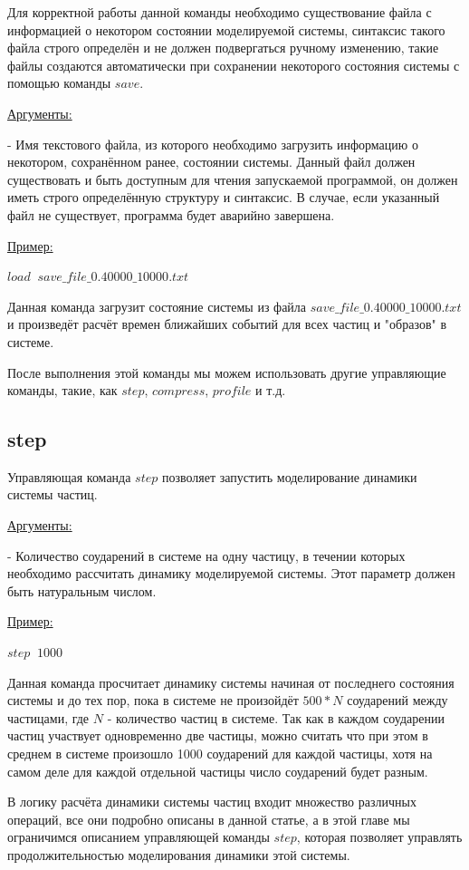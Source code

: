 \documentclass[a4paper]{article}
\begin{document}
Для корректной работы данной команды необходимо существование файла с информацией о некотором состоянии моделируемой системы, синтаксис такого файла строго определён и не должен подвергаться ручному изменению, такие файлы создаются автоматически при сохранении некоторого состояния системы с помощью команды $ save $.

\uline{Аргументы:}

- Имя текстового файла, из которого необходимо загрузить информацию о некотором, сохранённом ранее, состоянии системы. Данный файл должен существовать и быть доступным для чтения запускаемой программой, он должен иметь строго определённую структуру и синтаксис. В случае, если указанный файл не существует, программа будет аварийно завершена.

\uline{Пример:}

$ load \;\; save\_file\_0.40000\_10000.txt $

Данная команда загрузит состояние системы из файла $ save\_file\_0.40000\_10000.txt $ и произведёт расчёт времен ближайших событий для всех частиц и "образов" в системе.

После выполнения этой команды мы можем использовать другие управляющие команды, такие, как $ step $, $ compress $, $ profile $ и т.д.

\subsection{step}
Управляющая команда $ step $ позволяет запустить моделирование динамики системы частиц.

\uline{Аргументы:}

- Количество соударений в системе на одну частицу, в течении которых необходимо рассчитать динамику моделируемой системы. Этот параметр должен быть натуральным числом.

\uline{Пример:}

$ step \;\; 1000 $

Данная команда просчитает динамику системы начиная от последнего состояния системы и до тех пор, пока в системе не произойдёт $ 500*N $ соударений между частицами, где $ N $ - количество частиц в системе. Так как в каждом соударении частиц участвует одновременно две частицы, можно считать что при этом в среднем в системе произошло 1000 соударений для каждой частицы, хотя на самом деле для каждой отдельной частицы число соударений будет разным.

В логику расчёта динамики системы частиц входит множество различных операций, все они подробно описаны в данной статье, а в этой главе мы ограничимся описанием управляющей команды $ step $, которая позволяет управлять продолжительностью моделирования динамики этой системы.
\end{document}
